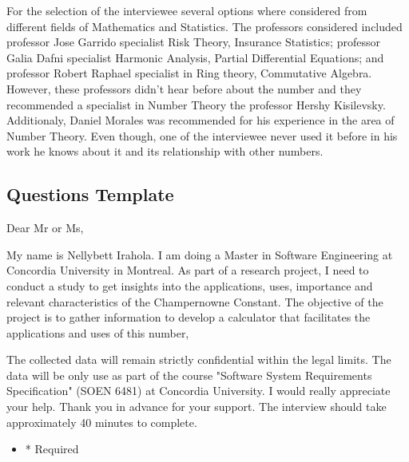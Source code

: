 \documentclass{report}
\begin{document}
For the selection of the interviewee several options where considered from different fields of Mathematics and Statistics. The professors considered included professor Jose Garrido specialist Risk Theory, Insurance Statistics; professor Galia Dafni specialist Harmonic Analysis, Partial Differential Equations; and professor Robert Raphael specialist in Ring theory, Commutative Algebra. However, these professors didn’t hear before about the number and they recommended a specialist in Number Theory the professor Hershy Kisilevsky. Additionaly, Daniel Morales was recommended for his experience in the area of Number Theory. Even though, one of the interviewee never used it before in his work he knows about it and its relationship with other numbers.


\subsection{Questions Template} %

Dear Mr or Ms,

My name is Nellybett Irahola. I am doing a Master in Software Engineering at Concordia University in Montreal. As part of a research project, I need to conduct a study to get insights into the applications, uses, importance and relevant characteristics of the Champernowne Constant. The objective of the project is to gather information to develop a calculator that facilitates the applications and uses of this number,

The collected data will remain strictly confidential within the legal limits. The data will be only use as part of the course "Software System Requirements Specification" (SOEN 6481) at Concordia University. I would really appreciate your help. Thank you in advance for your support. The interview should take approximately 40 minutes to complete.
\begin{itemize}
\color{red}
\item * Required
\end{itemize}
\end{document}
